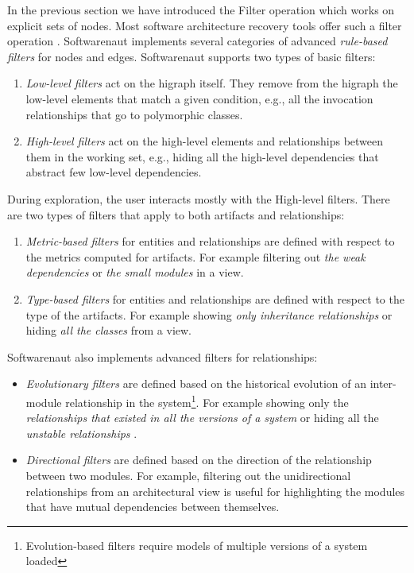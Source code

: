 \documentclass[preprint,12pt]{elsarticle}
\begin{document}
In the previous section we have introduced the Filter operation which works on explicit sets of nodes. Most software architecture recovery tools offer such a filter operation \cite{aracic-filtering}. Softwarenaut implements several categories of advanced {\em rule-based filters} for nodes and edges. Softwarenaut supports two types of basic filters: 

\begin{enumerate}

\item {\em Low-level filters} act on the higraph itself. They remove from the higraph the low-level elements that match a given condition, e.g., all the invocation relationships that go to polymorphic classes.

\item {\em High-level filters} act on the high-level elements and relationships between them in the working set, e.g., hiding all the high-level dependencies that abstract few low-level dependencies.

\end{enumerate}

During exploration, the user interacts mostly with the High-level filters. There are two types of filters that apply to both artifacts and relationships: 

\begin{enumerate}
\item {\em Metric-based filters} for entities and relationships are defined with respect to the metrics computed for artifacts. For example filtering out {\em the weak dependencies} or {\em the small modules} in a view.
\item {\em Type-based filters} for entities and relationships are defined with respect to the type of the artifacts. For example showing {\em only inheritance relationships} or hiding {\em all the classes} from a view.
\end{enumerate}

Softwarenaut also implements advanced filters for relationships:

\begin{itemize}

\item {\em Evolutionary filters} are defined based on the historical evolution of an inter-module relationship in the system\footnote{Evolution-based filters require models of multiple versions of a system loaded}. For example showing only the {\em relationships that existed in all the versions of a system} or hiding all the {\em unstable relationships} \cite{lungu-relevo}.

\item {\em Directional filters} are defined based on the direction of the relationship between two modules. For example, filtering out the unidirectional relationships from an architectural view is useful for highlighting the modules that have mutual dependencies between themselves. 

\end{itemize}
\end{document}

